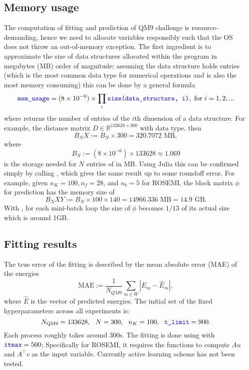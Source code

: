 \documentclass[12pt]{article}
\begin{document}
\subsection{Memory usage}
The computation of fitting and prediction of QM9 challenge is resource-demanding, hence we need to allocate variables responsibly such that the OS does not throw an out-of-memory exception. The first ingredient is to approximate the size of data structures allocated within the program in megabytes (MB) order of magnitude; assuming the data structure holds  entries (which is the most common data type for numerical operations and is also the most memory consuming) this can be done by a general formula
\begin{equation}
	\codeword{mem_usage} = (8\times 10^{-6}) \times \prod_{i}\codeword{size(data_structure, i)}, \text{ for } i = 1,2,...
\end{equation}
where  returns the number of entries of the $i$th dimension of a data structure. For example, the distance matrix $D \in \mathbb{R}^{133628 \times 300}$ with  data type, then
\begin{equation}
	B_NX := B_N \times 300 = 320.7072 \text{ MB},
\end{equation}
where
\begin{equation}
	B_N := (8\times 10^{-6}) \times 133628 \approx 1.069
\end{equation}
is the storage needed for $N$ entries of  in MB.
Using Julia this can be confirmed simply by calling , which gives the same result up to some roundoff error. For example, given $n_K = 100,n_f=28$, and $n_b = 5$ for ROSEMI, the block matrix $\phi$ for prediction has the memory size of
\begin{equation}
	B_NXY := B_N \times 100 \times 140 = 14966.336 \text{ MB} = 14.9 \text{ GB}.
\end{equation}
With , for each mini-batch loop the size of $\phi$ becomes $1/13$ of its actual size which is around 1GB. 


\subsection{Fitting results}
\label{subsec:fitting}
The true error of the fitting is described by the mean absolute error (MAE) of the energies
\begin{equation}
	\text{MAE} := \frac{1}{N_{QM9}}\sum_{m \in W}|E_{m} - \hat{E}_m|,
\end{equation}
where $\hat{E}$ is the vector of predicted energies.
The initial set of the fixed hyperparameters across all experiments is:
\begin{equation*}
	N_\text{QM9} = 133628, ~~ N = 300,~~ n_K = 100, ~~\codeword{t_limit} = 900.
\end{equation*}
Each  process roughly takes around 300s. 
The fitting is done using  with $\codeword{itmax} = 500$; Specifically for ROSEMI, it requires the functions to compute $Au$ and $A^\top v$ as the input variable. 
Currently active learning scheme has not been tested.
\end{document}

